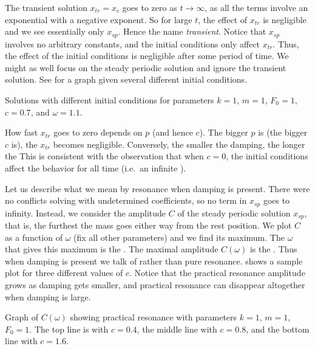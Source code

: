 The transient solution $x_{tr} = x_c$ goes to zero as $t \to \infty$,
as all the terms involve an exponential with a negative exponent.  So
for large $t$, the effect of $x_{tr}$ is negligible and we see essentially
only $x_{sp}$.
Hence the name \emph{transient}.
Notice that $x_{sp}$ involves no arbitrary constants, and
the initial conditions only affect $x_{tr}$.  Thus, the effect
of the initial conditions is negligible after some period of time.
We might as well focus on the
steady periodic solution and ignore the transient solution.  See
 for a graph given several different initial conditions.

\begin{mywrapfig}[15]{3.25in}
\capstart
{}
\caption{Solutions with different initial conditions for parameters
$k=1$, $m=1$, $F_0 = 1$, $c=0.7$, and $\omega=1.1$.\label{3.6:transbehfig}}
\end{mywrapfig}

How fast $x_{tr}$ goes to zero depends on $p$ (and
hence $c$).  The
bigger $p$ is (the bigger $c$ is), the  $x_{tr}$ becomes negligible. 
Conversely, the smaller the damping, the longer the 
This is consistent
with the observation that when $c=0$, the initial conditions affect the
behavior for all time (i.e.\ an infinite ).

\medskip

Let us describe what we mean by resonance when damping is present.
There were no conflicts solving with undetermined coefficients,
so
no term in $x_{sp}$ goes to infinity.  Instead, we consider the
amplitude $C$ of the steady periodic solution $x_{sp}$,
that is, the furthest the
mass goes either way from the rest
position.
We plot $C$
as a function of $\omega$ (fix all other
parameters) and we find its maximum.
The $\omega$ that gives this maximum
is the \emph{}.
The maximal amplitude $C(\omega)$ is
the \emph{}.
Thus when damping is present we talk of \emph{}
rather than pure resonance.
 shows a
sample plot for three different
values of $c$.  Notice that the
practical resonance amplitude grows as damping gets smaller, and 
practical resonance can disappear altogether when damping is large.

\begin{myfig}
\capstart
{}
\caption{Graph of $C(\omega)$ showing practical resonance with parameters
$k=1$, $m=1$, $F_0 = 1$. The top line is with $c=0.4$, the middle line with
$c=0.8$, and the bottom line with
$c=1.6$.\label{3.6:pracresfig}}
\end{myfig}

